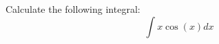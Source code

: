 \documentclass{exam}
\begin{document}
\begin{questions}
\begin{question}
Calculate the following integral:
\[
\int x \cos(x) dx
\]
\end{question}
\end{questions}
\end{document}
